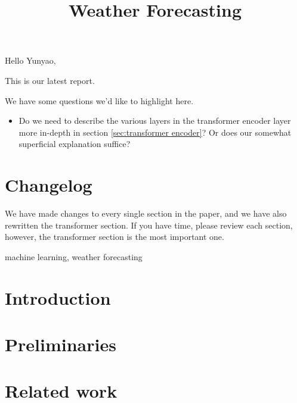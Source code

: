 


Hello Yunyao,

This is our latest report.

We have some questions we'd like to highlight here.

\begin{itemize}
    \item Do we need to describe the various layers in the transformer encoder layer more in-depth in section \ref{sec:transformer encoder}? Or does our somewhat superficial explanation suffice? 
\end{itemize}

\section{Changelog}
We have made changes to every single section in the paper, and we have also rewritten the transformer section. 
If you have time, please review each section, however, the transformer section is the most important one.

\newpage

\title{Weather Forecasting}
\author{
    \and
    \and
    \and
}

\maketitle

\begin{abstract}
\end{abstract}

\begin{IEEEkeywords}
machine learning, weather forecasting
\end{IEEEkeywords}

\section{Introduction}


\section{Preliminaries}


\section{Related work}\label{sec:relatedwork}






